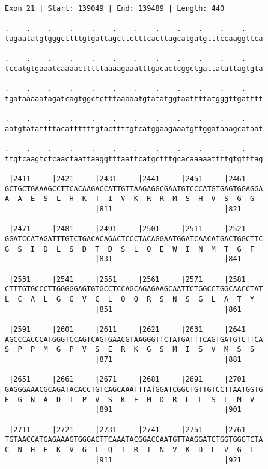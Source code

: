 \documentclass{article}
\begin{document}
\begin{Verbatim}
Exon 21 | Start: 139049 | End: 139489 | Length: 440
 
.    .    .    .    .    .    .    .    .    .    .    .    
tagaatatgtgggcttttgtgattagcttctttcacttagcatgatgtttccaaggttca
  
.    .    .    .    .    .    .    .    .    .    .    .    
tccatgtgaaatcaaaactttttaaaagaaatttgacactcggctgattatattagtgta
  
.    .    .    .    .    .    .    .    .    .    .    .    
tgataaaaatagatcagtggctctttaaaaatgtatatggtaattttatgggttgatttt
  
.    .    .    .    .    .    .    .    .    .    .    .    
aatgtatattttacattttttgtacttttgtcatggaagaaatgttggataaagcataat
  
.    .    .    .    .    .    .    .    .    .    .    .    
ttgtcaagtctcaactaattaaggtttaattcatgctttgcacaaaaattttgtgtttag
  
 |2411     |2421     |2431     |2441     |2451     |2461    
GCTGCTGAAAGCCTTCACAAGACCATTGTTAAGAGGCGAATGTCCCATGTGAGTGGAGGA
A  A  E  S  L  H  K  T  I  V  K  R  R  M  S  H  V  S  G  G  
                     |811                          |821     
  
 |2471     |2481     |2491     |2501     |2511     |2521    
GGATCCATAGATTTGTCTGACACAGACTCCCTACAGGAATGGATCAACATGACTGGCTTC
G  S  I  D  L  S  D  T  D  S  L  Q  E  W  I  N  M  T  G  F  
                     |831                          |841     
  
 |2531     |2541     |2551     |2561     |2571     |2581    
CTTTGTGCCCTTGGGGGAGTGTGCCTCCAGCAGAGAAGCAATTCTGGCCTGGCAACCTAT
L  C  A  L  G  G  V  C  L  Q  Q  R  S  N  S  G  L  A  T  Y  
                     |851                          |861     
  
 |2591     |2601     |2611     |2621     |2631     |2641    
AGCCCACCCATGGGTCCAGTCAGTGAACGTAAGGGTTCTATGATTTCAGTGATGTCTTCA
S  P  P  M  G  P  V  S  E  R  K  G  S  M  I  S  V  M  S  S  
                     |871                          |881     
  
 |2651     |2661     |2671     |2681     |2691     |2701    
GAGGGAAACGCAGATACACCTGTCAGCAAATTTATGGATCGGCTGTTGTCCTTAATGGTG
E  G  N  A  D  T  P  V  S  K  F  M  D  R  L  L  S  L  M  V  
                     |891                          |901     
  
 |2711     |2721     |2731     |2741     |2751     |2761    
TGTAACCATGAGAAAGTGGGACTTCAAATACGGACCAATGTTAAGGATCTGGTGGGTCTA
C  N  H  E  K  V  G  L  Q  I  R  T  N  V  K  D  L  V  G  L  
                     |911                          |921     
  

\end{Verbatim}
\end{document}

